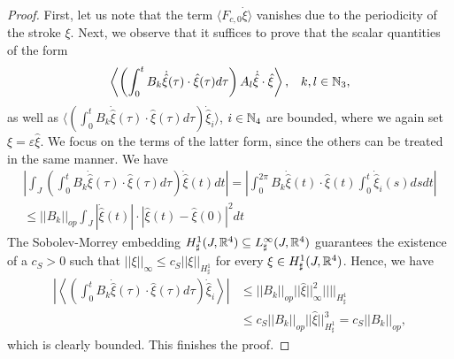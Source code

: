 \begin{proof}
First, let us note that the term $\langle F_{c,0} \dot{\xi} \rangle$ vanishes due to the periodicity of the stroke $\xi$. Next, we observe that it suffices to prove that the scalar quantities of the form 
\begin{align}
\left \langle \left ( \int_{0}^{t} B_k \dot{\hat{\xi}}(\tau)  \cdot \hat{\xi}(\tau) d\tau \right ) A_l \dot{\hat{\xi}} \cdot \hat{\xi} \right  \rangle, & & k,l \in \mathbb{N}_3,
\end{align}
as well as $ \langle  ( \int_{0}^{t} B_k \dot{\hat{\xi}}(\tau)  \cdot \hat{\xi}(\tau) d \tau  )\dot{\hat{\xi}}_i  \rangle$, $i \in \mathbb{N}_4$ are bounded, where we again set $\xi = \varepsilon \hat{\xi}$. We focus on the terms of the latter form, since the others can be treated in the same manner. We have
\begin{equation}
\begin{aligned}
\left |\int_J \left ( \int_{0}^{t} B_k \dot{\hat{\xi}}(\tau) \cdot \hat{\xi}(\tau) d\tau\right ) \dot{\hat{\xi}}(t) dt \right | = \left | \int_{0}^{2\pi} B_k \dot{\hat{\xi}}(t) \cdot \hat{\xi}(t) \int_{0}^{t} \dot{\hat{\xi}}_i(s) ds dt \right |\\
\leq ||B_k||_{op} \int_{J} |\dot{\hat{\xi}}(t)| \cdot |\hat{\xi}(t) - \hat{\xi}(0)|^2 dt
\end{aligned}
\end{equation}
The Sobolev-Morrey embedding $H_\sharp^{1}(J, \mathbb{R}^4) \subseteq L^\infty_{\sharp}(J, \mathbb{R}^4)$ guarantees the existence of a $c_S > 0$ such that $||\xi||_{\infty} \leq c_S ||\xi||_{H_\sharp^1}$ for every $\xi \in H_\sharp^1(J, \mathbb{R}^4)$. Hence, we have
\begin{equation}
\begin{aligned}
\left | \left \langle \left  ( \int_{0}^{t} B_k \dot{\hat{\xi}}(\tau)  \cdot \hat{\xi}(\tau) d \tau  \right )\dot{\hat{\xi}}_i \right  \rangle\right |
& \leq ||B_k||_{op} ||\hat{\xi}||_{\infty}^2 ||||_{H_\sharp^1}\\
&\leq c_S ||B_k||_{op} ||\hat{\xi}||_{H_\sharp^1}^3 = c_S ||B_k||_{op},
\end{aligned}
\end{equation}
which is clearly bounded. This finishes the proof.
\end{proof}

